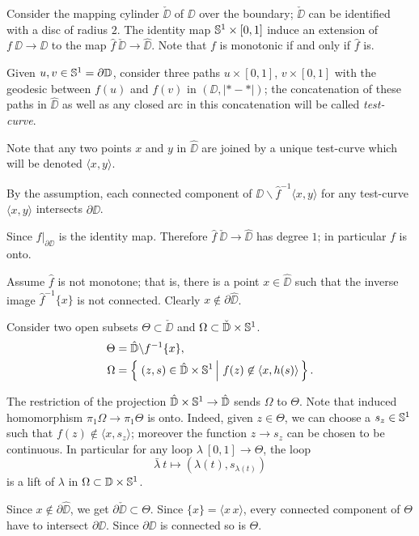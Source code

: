 \documentclass{article}
\begin{document}
Consider the mapping cylinder $\check \DD$ of $\DD$ over the boundary;
$\check \DD$ can be identified with a disc of radius $2$.
The identity map $\mathbb{S}^1\times [0,1]$ induce an extension of $f\:\DD\to \DD$ to the map 
$\hat f\:\check \DD\to \hat \DD$.
Note that $f$ is monotonic if and only if $\hat f$ is.

Given $u,v\in\mathbb{S}^1=\partial\mathbb{D}$, consider three paths $u\times [0,1]$, $v\times[0,1]$ with the geodesic between $f(u)$ and $f(v)$ in $(\DD,|{*}-{*}|)$;
the concatenation of these paths in $\hat \DD$ as well as any closed arc in this concatenation will be called \emph{test-curve}.

Note that any two points $x$ and $y$ in $\hat \DD$ are joined by a unique test-curve which will be denoted $\langle x,y\rangle$.

By the assumption, each connected component of $\DD\backslash \hat f^{-1}\langle x,y\rangle$ for any test-curve $\langle x,y\rangle$ intersects $\partial \hat \DD$.

Since $\hat f|_{\partial\DD}$ is the identity map.
Therefore $\hat f\:\check \DD\to \hat \DD$ has degree $1$;
in particular $f$ is onto.

Assume $\hat f$ is not monotone;
that is, there is a point $x\in \hat\DD$ such that the inverse image $\hat f^{-1}\{x\}$ is not connected.
Clearly $x\notin\partial \hat\DD$.

Consider two open subsets $\Theta\subset\check \DD$ and $\Omega\subset \check {\mathbb{D}}\times\mathbb{S}^1$.
\begin{align*}
\Theta&=\hat \DD\backslash f^{-1}\{x\},
\\
\Omega&=\set{(z,s)\in \hat \DD\times\SS^1}{f(z)\not\in \langle x,h(s)\rangle}.
\end{align*}

The restriction of the projection $\hat {\mathbb{D}}\times\mathbb{S}^1\to \hat {\mathbb{D}}$ sends $\Omega$ to $\Theta$.
Note that induced homomorphism $\pi_1\Omega\to \pi_1\Theta$ is onto.
Indeed, given $z\in \Theta$, we can choose a $s_z\in\mathbb{S}^1$ such that 
$f(z)\notin \langle x,s_z\rangle$;
moreover the function $z\to s_z$ can be chosen to be continuous.
In particular for any loop $\lambda\:[0,1]\to\Theta$, the loop 
\[\bar\lambda\:t\mapsto (\lambda(t),s_{\lambda(t)})\]
is a lift of $\lambda$ in $\Omega\subset \mathbb{D}\times\mathbb{S}^1$.

Since $x\notin\partial \hat \DD$, we get $\partial\check \DD\subset \Theta$.
Since $\{x\}=\langle x\,x\rangle$, every connected component of $\Theta$ have to intersect $\partial\DD$.
Since $\partial\DD$ is connected so is $\Theta$.
\end{document}
